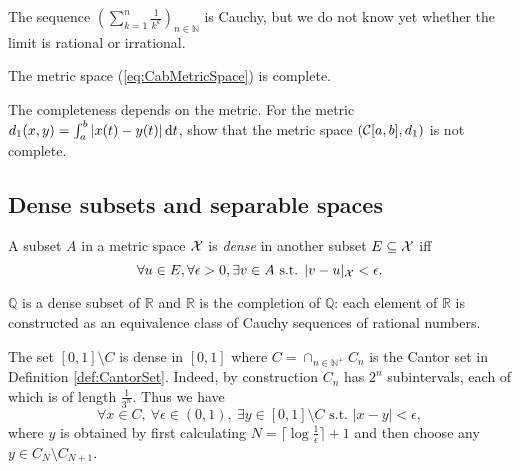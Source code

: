 \begin{exm}
  The sequence $(\sum_{k=1}^n\frac{1}{k^k})_{n\in\mathbb{N}}$
  is Cauchy, 
  but we do not know yet
  whether the limit is rational or irrational.
\end{exm}

\begin{lem}
  \label{lem:CabMetricSpace}
  The metric space (\ref{eq:CabMetricSpace}) is complete.
\end{lem}

\begin{exc}
  The completeness depends on the metric.
  For the metric 
  $d_1(x,y)=\int_a^b|x(t)-y(t)|\,\mathrm{d} t$,
  show that the metric space $({\cal C}[a,b],d_1)$
  is not complete.
\end{exc}

\subsection{Dense subsets and separable spaces}
\label{sec:dense-subsets}

\begin{defn}
  \label{def:denseSetMetricSpace}
  A subset $A$ in a metric space ${\cal X}$
  is \emph{dense} in another subset $E\subseteq {\cal X}$
  iff
  \begin{equation}
    \label{eq:denseSet}
    \forall u\in E, \forall \epsilon>0, \exists v\in A
    \text{ s.t. } |v-u|_{\cal X} < \epsilon.
  \end{equation}
\end{defn}

\begin{exm}
  \label{exm:QisDenseInR}
  $\mathbb{Q}$ is a dense subset of $\mathbb{R}$
  and $\mathbb{R}$ is the completion of $\mathbb{Q}$:
  each element of $\mathbb{R}$ is constructed
  as an equivalence class of Cauchy sequences of rational numbers.
\end{exm}

\begin{exm}
  \label{exm:CantorSetRemovedDense}
  The set $[0,1]\setminus C$ is dense in $[0,1]$
  where $C=\cap_{n\in \mathbb{N}^+} C_n$ is the Cantor set
  in Definition \ref{def:CantorSet}.
  Indeed, by construction $C_n$ has $2^{n}$ subintervals,
  each of which is of length $\frac{1}{3^n}$.
  Thus we have
  \begin{displaymath}
    \forall x\in C,\ \forall \epsilon\in (0,1),\
    \exists y\in [0,1]\setminus C \text{ s.t. }
    |x-y|<\epsilon,
  \end{displaymath}
  where $y$ is obtained by first calculating
  $N=\lceil \log\frac{1}{\epsilon}\rceil+1$
  and then choose any $y\in C_N\setminus C_{N+1}$.
\end{exm}

